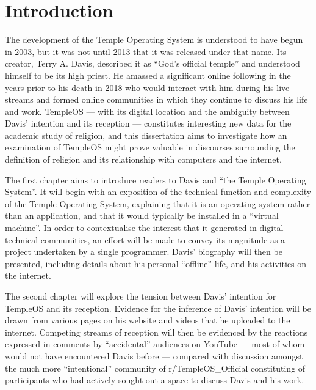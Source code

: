 \documentclass[Draft.tex]{subfiles}
\begin{document}
\chapter*{Introduction}

The development of the Temple Operating System\footnotemark\thinspace
is understood to have begun in 2003,
but it was not until 2013 that it was released under that name.
Its creator, Terry A. Davis, described it as ``God's official temple''
and understood himself to be its high priest.
He amassed a significant online following
in the years prior to his death in 2018
who would interact with him during his live streams
and formed online communities
in which they continue to discuss his life and work.
TempleOS --- with its digital location and the ambiguity between
Davis' intention and its reception --- constitutes interesting new data
for the academic study of religion,
and this dissertation aims to investigate how
an examination of TempleOS might prove valuable
in discourses surrounding the definition of religion
and its relationship with computers and the internet.


The first chapter aims to introduce readers to Davis and ``the Temple
Operating System''.
It will begin with an exposition of the technical function
and complexity of the Temple Operating System,
explaining that it is an operating system rather than an application,
and that it would typically be installed in a ``virtual machine''.
In order to contextualise the interest that it generated
in digital-technical communities, an effort will be made to convey
its magnitude as a project undertaken by a single programmer.
Davis' biography will then be presented, including details about his
personal ``offline'' life, and his activities on the internet.

The second chapter will explore the tension between
Davis' intention for TempleOS and its reception.
Evidence for the inference of Davis' intention will be drawn from
various pages on his website and videos that he uploaded to the internet.
Competing streams of reception will then be evidenced
by the reactions expressed in comments by ``accidental'' audiences on YouTube ---
most of whom would not have encountered Davis before ---
compared with discussion amongst the much more ``intentional''
community of r/TempleOS\_Official constituting of participants who had
actively sought out a space to discuss Davis and his work.
\end{document}
